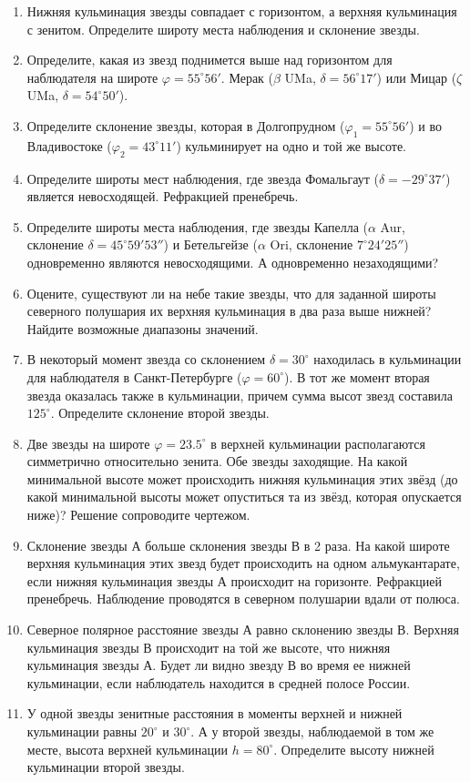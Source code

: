 \begin{enumerate}
    \item Нижняя кульминация звезды совпадает с горизонтом, а верхняя кульминация с зенитом. Определите широту места наблюдения и склонение звезды.
    \item Определите, какая из звезд поднимется выше над горизонтом для наблюдателя на широте $\varphi=55^\circ56'$. Мерак ($\beta$ UMa, $\delta= 56^\circ17'$) или Мицар ($\zeta$ UMa, $\delta = 54^\circ50'$).
    \item Определите склонение звезды, которая в Долгопрудном ($\varphi_1 = 55^\circ56'$) и во Владивостоке ($\varphi_2 = 43^\circ11'$) кульминирует на одно и той же высоте.
    \item Определите широты мест наблюдения, где звезда Фомальгаут ($\delta=-29^\circ37'$) является невосходящей. Рефракцией пренебречь.
    \item Определите широты места наблюдения, где звезды Капелла ($\alpha$ Aur, склонение $\delta=45^\circ59'53''$) и Бетельгейзе ($\alpha$ Ori, склонение $7^\circ24'25''$) одновременно являются невосходящими. А одновременно незаходящими?
    \item Оцените, существуют ли на небе такие звезды, что для заданной широты северного полушария их верхняя кульминация в два раза выше нижней? Найдите возможные диапазоны значений.
    \item В некоторый момент звезда со склонением $\delta = 30^\circ$ находилась в кульминации для наблюдателя в Санкт-Петербурге ($\varphi = 60^\circ$). В тот же момент вторая звезда оказалась также в кульминации, причем сумма высот звезд составила $125^\circ$. Определите склонение второй звезды.
    \item Две звезды на широте $\varphi = 23.5^\circ$ в верхней кульминации располагаются симметрично относительно зенита. Обе звезды заходящие. На какой минимальной высоте может происходить нижняя кульминация этих звёзд (до какой минимальной высоты может опуститься та из звёзд, которая опускается ниже)? Решение сопроводите чертежом.
    \item Склонение звезды А больше склонения звезды В в 2 раза. На какой широте верхняя кульминация этих звезд будет происходить на одном альмукантарате, если нижняя кульминация звезды А происходит на горизонте. Рефракцией пренебречь. Наблюдение проводятся в северном полушарии вдали от полюса.
    \item Северное полярное расстояние звезды А равно склонению звезды В. Верхняя кульминация звезды В происходит на той же высоте, что нижняя кульминация звезды А. Будет ли видно звезду В во время ее нижней кульминации, если наблюдатель находится в средней полосе России.
    \item У одной звезды зенитные расстояния в моменты верхней и нижней кульминации равны $20^\circ $ и $30^\circ$. А у второй звезды, наблюдаемой в том же месте, высота верхней кульминации $h= 80^\circ$. Определите высоту нижней кульминации второй звезды.
\end{enumerate}